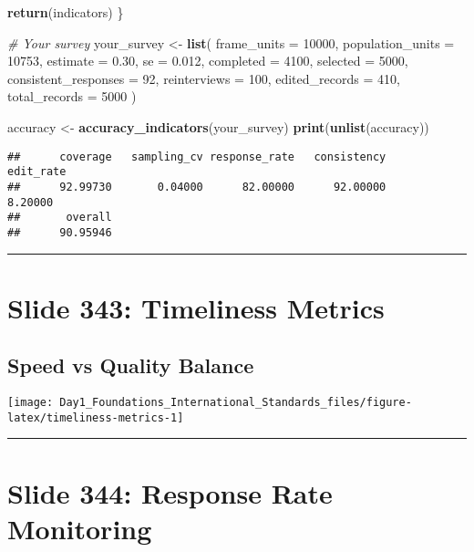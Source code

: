 \documentclass[
]{article}
\newenvironment{Shaded}{\begin{snugshade}}{\end{snugshade}}
\newcommand{\AttributeTok}[1]{\textcolor[rgb]{0.13,0.29,0.53}{#1}}
\newcommand{\CommentTok}[1]{\textcolor[rgb]{0.56,0.35,0.01}{\textit{#1}}}
\newcommand{\DecValTok}[1]{\textcolor[rgb]{0.00,0.00,0.81}{#1}}
\newcommand{\FloatTok}[1]{\textcolor[rgb]{0.00,0.00,0.81}{#1}}
\newcommand{\FunctionTok}[1]{\textcolor[rgb]{0.13,0.29,0.53}{\textbf{#1}}}
\newcommand{\NormalTok}[1]{#1}
\newcommand{\OtherTok}[1]{\textcolor[rgb]{0.56,0.35,0.01}{#1}}
\begin{document}
\begin{Shaded}
\begin{Highlighting}[]
  \FunctionTok{return}\NormalTok{(indicators)}
\NormalTok{\}}

\CommentTok{\# Your survey}
\NormalTok{your\_survey }\OtherTok{\textless{}{-}} \FunctionTok{list}\NormalTok{(}
  \AttributeTok{frame\_units =} \DecValTok{10000}\NormalTok{, }\AttributeTok{population\_units =} \DecValTok{10753}\NormalTok{,}
  \AttributeTok{estimate =} \FloatTok{0.30}\NormalTok{, }\AttributeTok{se =} \FloatTok{0.012}\NormalTok{,}
  \AttributeTok{completed =} \DecValTok{4100}\NormalTok{, }\AttributeTok{selected =} \DecValTok{5000}\NormalTok{,}
  \AttributeTok{consistent\_responses =} \DecValTok{92}\NormalTok{, }\AttributeTok{reinterviews =} \DecValTok{100}\NormalTok{,}
  \AttributeTok{edited\_records =} \DecValTok{410}\NormalTok{, }\AttributeTok{total\_records =} \DecValTok{5000}
\NormalTok{)}

\NormalTok{accuracy }\OtherTok{\textless{}{-}} \FunctionTok{accuracy\_indicators}\NormalTok{(your\_survey)}
\FunctionTok{print}\NormalTok{(}\FunctionTok{unlist}\NormalTok{(accuracy))}
\end{Highlighting}
\end{Shaded}

\begin{verbatim}
##      coverage   sampling_cv response_rate   consistency     edit_rate 
##      92.99730       0.04000      82.00000      92.00000       8.20000 
##       overall 
##      90.95946
\end{verbatim}

\begin{center}\rule{0.5\linewidth}{0.5pt}\end{center}

\section{Slide 343: Timeliness
Metrics}\label{slide-343-timeliness-metrics}

\subsection{Speed vs Quality Balance}\label{speed-vs-quality-balance}

\texttt{[image: Day1\_Foundations\_International\_Standards\_files/figure-latex/timeliness-metrics-1]}

\begin{center}\rule{0.5\linewidth}{0.5pt}\end{center}

\section{Slide 344: Response Rate
Monitoring}\label{slide-344-response-rate-monitoring}
\end{document}
